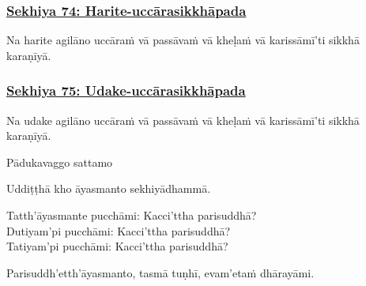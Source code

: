 \subsubsection*{\hyperref[training74]{Sekhiya 74: Harite-uccārasikkhāpada}}
\label{sekh74}

Na harite agilāno uccāraṁ vā passāvaṁ vā kheḷaṁ vā karissāmī'ti sikkhā karaṇīyā.



\subsubsection*{\hyperref[training75]{Sekhiya 75: Udake-uccārasikkhāpada}}
\label{sekh75}

Na udake agilāno uccāraṁ vā passāvaṁ vā kheḷaṁ vā karissāmī'ti sikkhā karaṇīyā.

\begin{center}
	Pādukavaggo sattamo\makeatletter\hyperlink{endnote525-appendix}\makeatother \thinspace
\end{center}



\medskip

\begin{center}
	Uddiṭṭhā kho āyasmanto sekhiyā\makeatletter\hyperlink{endnote526-appendix}\makeatother \thinspace dhammā.

	\smallskip

	Tatth'āyasmante pucchāmi: Kacci'ttha parisuddhā?\\
	Dutiyam'pi pucchāmi: Kacci'ttha parisuddhā?\\
	Tatiyam'pi pucchāmi: Kacci'ttha parisuddhā?

	\smallskip

	Parisuddh'etth'āyasmanto, tasmā tuṇhī, evam'etaṁ dhārayāmi.\makeatletter\hyperlink{endnote527-appendix}\makeatother \thinspace
\end{center}

